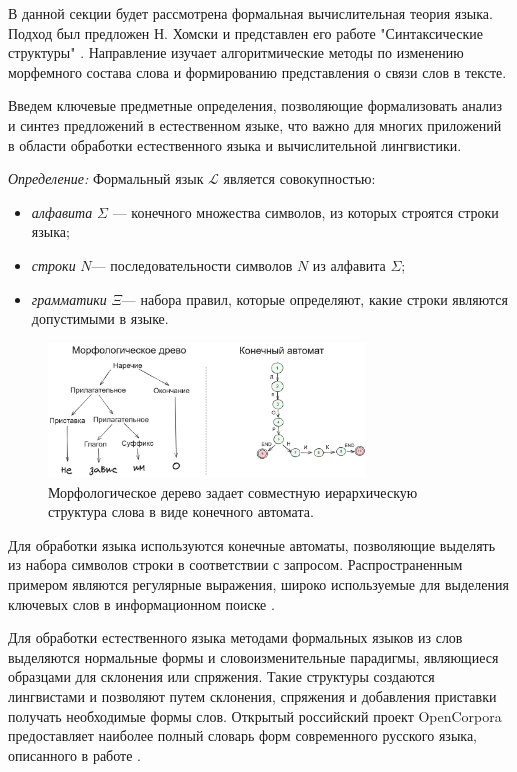 В данной секции будет рассмотрена формальная вычислительная теория языка.
Подход был предложен Н. Хомски и представлен его работе "Синтаксические структуры"  \cite{chomsky2002syntactic}. 
Направление изучает алгоритмические методы по изменению морфемного состава слова и формированию представления о связи слов в тексте.

Введем ключевые предметные определения, позволяющие формализовать анализ и синтез предложений в естественном языке, 
что важно для многих приложений в области обработки естественного языка и вычислительной лингвистики.
 
\textit{Определение:} Формальный язык $\mathcal{L}$ является совокупностью:
\begin{itemize}
    \item \textit{алфавита} $\Sigma$ --- конечного множества символов, из которых строятся строки языка;
    \item \textit{строки} $N$--- последовательности символов $N$ из алфавита $\Sigma$;
    \item \textit{грамматики} $\Xi$--- набора правил, которые определяют, какие строки являются допустимыми в языке.
\end{itemize}

\begin{figure}[h]
    \centering
    \includegraphics[width=0.75\textwidth]{assets/ml/nlp/morph_tree.excalidraw.png}
    \caption{Морфологическое дерево задает совместную иерархическую структура слова в виде конечного автомата.}
    \label{morph}
\end{figure}

Для обработки языка используются конечные автоматы, позволяющие выделять из набора символов строки в соответствии с запросом. 
Распространенным примером являются регулярные выражения, широко используемые для выделения ключевых слов в информационном поиске \cite{thompson1968programming}.

Для обработки естественного языка методами формальных языков из слов выделяются нормальные формы и словоизменительные парадигмы, являющиеся 
образцами для склонения или спряжения. Такие структуры создаются лингвистами и позволяют путем склонения,
спряжения и добавления приставки получать необходимые формы слов. Открытый российский проект OpenCorpora предоставляет
наиболее полный словарь форм современного русского языка, описанного в работе \cite{bocharov2011corpora}.

